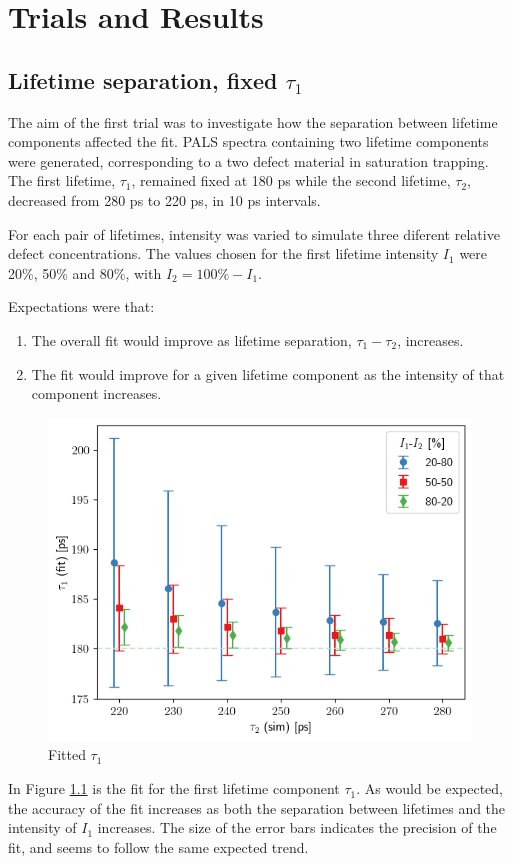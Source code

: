 \chapter{Trials and Results}

\section{Lifetime separation, fixed $\tau_1$}

The aim of the first trial was to investigate how the separation between lifetime components affected the fit. PALS spectra containing two lifetime components were generated, corresponding to a two defect material in saturation trapping. The first lifetime, $\tau_1$, remained fixed at 180 ps while the second lifetime, $\tau_2$, decreased from 280 ps to 220 ps, in 10 ps intervals. 

For each pair of lifetimes, intensity was varied to simulate three diferent relative defect concentrations. The values chosen for the first lifetime intensity $I_1$ were 20\%, 50\% and 80\%, with $I_2 = 100\%-I_1$. 

Expectations were that:
\begin{enumerate}[label=(\roman*)]
    \item The overall fit would improve as lifetime separation, $\tau_1-\tau_2$, increases.
    \item The fit would improve for a given lifetime component as the intensity of that component increases.
\end{enumerate}

\begin{figure} [h]
     
    \includegraphics[width=0.6\linewidth]{Batch 1+2/Batch1+2/output/plotfin/t1.png}
    \caption{Fitted $\tau_1$}
    \label{fig:180-tau1}
\end{figure}

In Figure \ref{fig:180-tau1} is the fit for the first lifetime component $\tau_1$. As would be expected, the accuracy of the fit increases as both the separation between lifetimes and the intensity of $I_1$ increases. The size of the error bars indicates the precision of the fit, and seems to follow the same expected trend.

